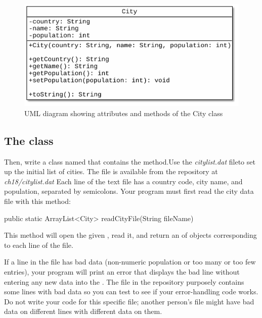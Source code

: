 \begin{exercise}
\begin{figure}[!h]
\begin{center}
\includegraphics[scale=0.75]{figs/ch18/city.pdf}
\caption{UML diagram showing attributes and methods of the City class}
\label{fig.ch18.cityUML}
\end{center}
\end{figure}


\subsection{The  class}

Then, write a class named  that contains the  method.Use the {\em citylist.dat} file\footnotemark to set up the initial list of cities. The file is available from the repository at {\em ch18/citylist.dat} Each line of the text file has a country code, city name, and population, separated by semicolons. Your program must first read the city data file with this method:


\begin{stdout}
public static ArrayList<City> readCityFile(String fileName)
\end{stdout}

This method will open the given , read it, and return an  of  objects corresponding to each line of the file.

If a line in the file has bad data (non-numeric population or too many or too few entries), your program will print an error that displays the bad line without entering any new data into the . The  file in the repository purposely contains some lines with bad data so you can test to see if your error-handling code works. Do not write your code for this specific file; another person's file might have bad data on different lines with different data on them.


\end{exercise}
